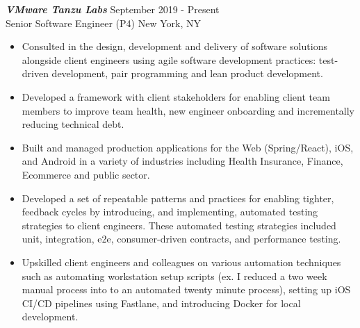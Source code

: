 {\sl \textbf{VMware Tanzu Labs}} \hfill September 2019 - Present \\ Senior Software Engineer (P4) \hfill New York, NY
\begin{itemize}
    \item Consulted in the design, development and delivery of software solutions alongside client engineers using agile software development practices: test-driven development, pair programming and lean product development.
    \item Developed a framework with client stakeholders for enabling client team members to improve team health, new engineer onboarding and incrementally reducing technical debt.
    \item Built and managed production applications for the Web (Spring/React), iOS, and Android in a variety of industries including Health Insurance, Finance, Ecommerce and public sector.
    \item Developed a set of repeatable patterns and practices for enabling tighter, feedback cycles by introducing, and implementing, automated testing strategies to client engineers. These automated testing strategies included unit, integration, e2e, consumer-driven contracts, and performance testing.
    \item Upskilled client engineers and colleagues on various automation techniques such as automating workstation setup scripts (ex. I reduced a two week manual process into to an automated twenty minute process), setting up iOS CI/CD pipelines using Fastlane, and introducing Docker for local development.
\end{itemize}
